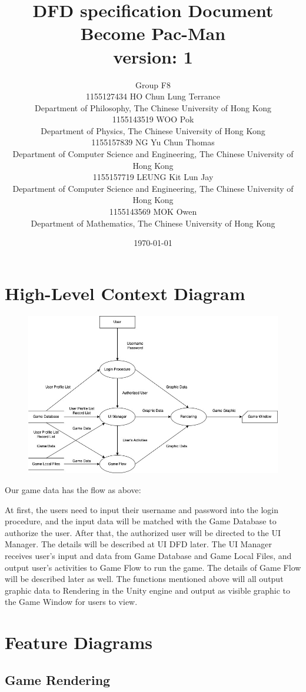 \documentclass[11pt]{article}
\title{DFD specification Document\\Become Pac-Man\\version: 1}
\author{Group F8\\1155127434 HO Chun Lung Terrance\\
Department of Philosophy, The Chinese University of Hong Kong\\1155143519 WOO Pok\\
Department of Physics, The Chinese University of Hong Kong\\1155157839 NG Yu Chun Thomas\\
Department of Computer Science and Engineering, The Chinese University of Hong Kong\\1155157719 LEUNG Kit Lun Jay\\
Department of Computer Science and Engineering, The Chinese University of Hong Kong\\1155143569 MOK Owen\\
Department of Mathematics, The Chinese University of Hong Kong}
\date{\today}
\begin{document}
\maketitle
\tableofcontents
\newpage

\section{High-Level Context Diagram}
\begin{figure}[H]
    \centering
    \includegraphics*[scale=0.5]{HLCDFD.jpg}
\end{figure}
Our game data has the flow as above:

At first, the users need to input their username and password into the login procedure, and the input data will be matched with the Game Database to authorize the user. After that, the authorized user will be directed to the UI Manager. The details will be described at UI DFD later. The UI Manager receives user's input and data from Game Database and Game Local Files, and output user's activities to Game Flow to run the game. The details of Game Flow will be described later as well. The functions mentioned above will all output graphic data to Rendering in the Unity engine and output as visible graphic to the Game Window for users to view.
\section{Feature Diagrams}
\subsection{Game Rendering}
\end{document}

